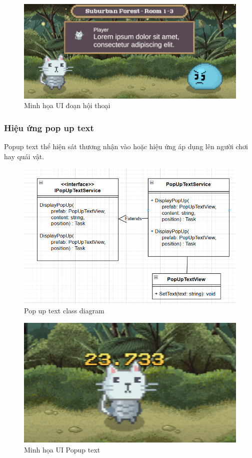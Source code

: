 \begin{figure}[H]
	\centering
	\includegraphics[width=13cm]{Images/DialogueUI.png}
	\vspace{0.5cm}
	\caption{Minh họa UI đoạn hội thoại}
\end{figure}

\subsubsection{Hiệu ứng pop up text}

Popup text thể hiện sát thương nhận vào hoặc hiệu ứng áp dụng lên người chơi hay quái vật.

\begin{figure}[H]
	\centering
	\includegraphics[width=13cm]{Images/PopUpText.png}
	\vspace{0.5cm}
	\caption{Pop up text class diagram}
\end{figure}

\begin{figure}[H]
	\centering
	\includegraphics[width=13cm]{Images/PopupTextUI.png}
	\vspace{0.5cm}
	\caption{Minh họa UI Popup text}
\end{figure}

